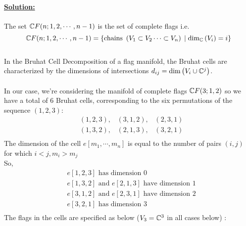 \documentclass[11pt]{article}
\begin{document}
\vskip 0.5cm
\textbf{\underline{Solution:}}
\\
\\
The set $\mathbb{C} F(n; 1,2,\cdots,n-1)$ is the set of complete flags i.e. $$ \mathbb{C} F(n;1,2,\cdots,n-1) = \left\{ \text{chains } \left(V_1 \subset V_2 \cdots \subset V_n\right) \;|\; \mathrm{dim}_{\mathbb{C}}\left(V_i\right) = i \right\} $$
\\
In the Bruhat Cell Decomposition of a flag manifold, the Bruhat cells are characterized by the dimensions of intersections $d_{ij} = \mathrm{dim}\left( V_i \cup \mathbb{C}^j \right)$.
\\
\\
In our case, we're considering the manifold of complete flags $\mathbb{C} F(3;1,2)$ so we have a total of $6$ Bruhat cells, corresponding to the six permutations of the sequence $(1,2,3)$:
\begin{align*}
  &(1,2,3), \;\;\; (3,1,2), \;\;\; (2,3,1) \\
  &(1,3,2), \;\;\; (2,1,3), \;\;\; (3,2,1) \\
\end{align*} The dimension of the cell $e[m_1, \cdots, m_n]$ is equal to the number of pairs $(i,j)$ for which $i < j, m_i > m_j$
\\
So, 
\begin{align*}
  &e[1,2,3] \text{ has dimension } 0 \\
  &e[1,3,2] \text{ and } e[2,1,3] \text{ have dimension } 1 \\
  &e[3,1,2] \text{ and } e[2,3,1] \text{ have dimension } 2 \\
  &e[3,2,1] \text{ has dimension } 3 \\
\end{align*} The flags in the cells are specified as below ($V_3 = \mathbb{C}^3$ in all cases below) :
\\
\\
\end{document}
